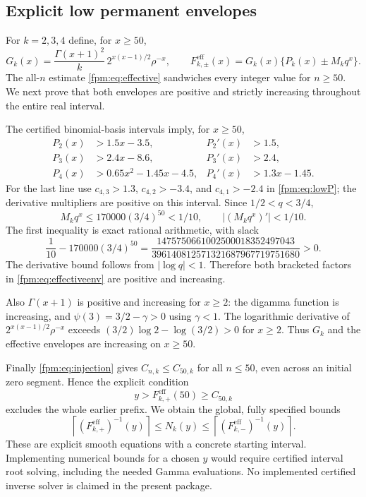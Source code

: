 \documentclass[11pt]{article}
\theoremstyle{definition}\newtheorem{definition}[theorem]{Definition}
\theoremstyle{remark}\newtheorem{remark}[theorem]{Remark}
\begin{document}
\subsection{Explicit low permanent envelopes}\label{fpm:sec:effectiveinverse}
For $k=2,3,4$ define, for $x\ge50$,
\begin{equation}\label{fpm:eq:effectiveenv}
 G_k(x)=\frac{\Gamma(x+1)^2}{k}\,2^{x(x-1)/2}\rho^{-x},
 \qquad F^{\mathrm{eff}}_{k,\pm}(x)=G_k(x)\{P_k(x)\pm M_kq^x\}.
\end{equation}
The all-$n$ estimate \eqref{fpm:eq:effective} sandwiches every integer value for $n\ge50$. We next prove that both envelopes are positive and strictly increasing throughout the entire real interval.

The certified binomial-basis intervals imply, for $x\ge50$,
\begin{align*}
 P_2(x)&>1.5x-3.5,&P_2'(x)&>1.5,\\
 P_3(x)&>2.4x-8.6,&P_3'(x)&>2.4,\\
 P_4(x)&>0.65x^2-1.45x-4.5,&P_4'(x)&>1.3x-1.45.
\end{align*}
For the last line use $c_{4,3}>1.3$, $c_{4,2}>-3.4$, and $c_{4,1}>-2.4$ in \eqref{fpm:eq:lowP}; the derivative multipliers are positive on this interval. Since $1/2<q<3/4$,
\begin{equation}\label{fpm:eq:perturb}
 M_kq^x\le170000(3/4)^{50}<1/10,
 \qquad |(M_kq^x)'|<1/10.
\end{equation}
The first inequality is exact rational arithmetic, with slack
\[
 \frac1{10}-170000(3/4)^{50}
 =\frac{1475750661002500018352497043}{396140812571321687967719751680}>0.
\]
The derivative bound follows from $|\log q|<1$. Therefore both bracketed factors in \eqref{fpm:eq:effectiveenv} are positive and increasing.

Also $\Gamma(x+1)$ is positive and increasing for $x\ge2$: the digamma function is increasing, and $\psi(3)=3/2-\gamma>0$ using $\gamma<1$. The logarithmic derivative of $2^{x(x-1)/2}\rho^{-x}$ exceeds $(3/2)\log2-\log(3/2)>0$ for $x\ge2$. Thus $G_k$ and the effective envelopes are increasing on $x\ge50$.

Finally \eqref{fpm:eq:injection} gives $C_{n,k}\le C_{50,k}$ for all $n\le50$, even across an initial zero segment. Hence the explicit condition
\[
 y>F^{\mathrm{eff}}_{k,+}(50)\ge C_{50,k}
\]
excludes the whole earlier prefix. We obtain the global, fully specified bounds
\begin{equation}\label{fpm:eq:effectiveinverse}
 \left\lceil(F^{\mathrm{eff}}_{k,+})^{-1}(y)\right\rceil
 \le N_k(y)\le
 \left\lceil(F^{\mathrm{eff}}_{k,-})^{-1}(y)\right\rceil.
\end{equation}
These are explicit smooth equations with a concrete starting interval. Implementing numerical bounds for a chosen $y$ would require certified interval root solving, including the needed Gamma evaluations. No implemented certified inverse solver is claimed in the present package.
\end{document}
